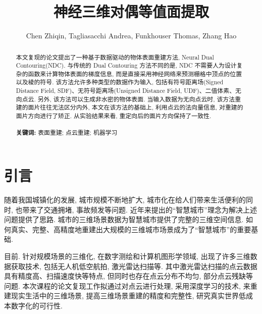 
\usepackage[algo2e]{algorithm2e}
\usepackage{tabularx}
\usepackage{graphicx}
\usepackage{listings}
\usepackage{xcolor}

\title{神经三维对偶等值面提取}
\author{Chen Zhiqin, Tagliasacchi Andrea, Funkhouser Thomas, Zhang Hao}

 
\maketitle

\begin{abstract}
    本文复现的论文提出了一种基于数据驱动的物体表面重建方法, Neural Dual Contouring(NDC)\cite{chen2022neural}. 
	与传统的 Dual Contouring \cite{ju2002dual}方法不同的是, NDC 不需要人为设计复杂的函数来计算物体表面的梯度信息, 而是直接采用神经网络来预测栅格中顶点的位置以及棱的符号. 
	该方法允许多种类型的数据作为输入, 包括有符号距离场(Signed Distance Field, SDF)、无符号距离场(Unsigned Distance Field, UDF)、二值体素、无向点云. 
	另外, 该方法可以生成非水密的物体表面. 当输入数据为无向点云时, 该方法重建的面片往往无法区分内外, 本文在该方法的基础上, 利用点云的法向量信息, 对重建的面片方向进行了矫正. 
	从实验结果来看, 重定向后的面片方向保持了一致性. 
 	\\\\
 	\textbf{关键词: }表面重建; 点云重建; 机器学习
\end{abstract}

\section{引言}

随着我国城镇化的发展, 城市规模不断地扩大, 城市化在给人们带来生活便利的同时, 也带来了交通拥堵, 事故频发等问题. 
近年来提出的“智慧城市”理念为解决上述问题提供了思路. 城市的三维场景数据为智慧城市提供了完整的三维空间信息. 
如何真实、完整、高精度地重建出大规模的三维城市场景成为了“智慧城市”的重要基础. 

目前. 针对规模场景的三维化, 在数字测绘和计算机图形学领域, 出现了许多三维数据获取技术, 包括无人机低空航拍, 激光雷达扫描等. 
其中激光雷达扫描的点云数据具有精度高、扫描速度快等特点, 但同时也存在点云分布不均匀, 部分点云残缺等问题. 
本次课程的论文复现工作拟通过对点云进行处理, 采用深度学习的技术, 来重建现实生活中的三维场景, 提高三维场景重建的精度和完整性, 研究真实世界低成本数字化的可行性. 

